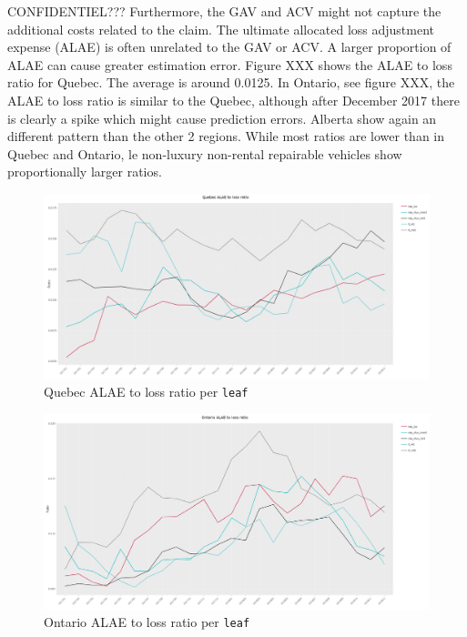 	CONFIDENTIEL???
	Furthermore, the GAV and ACV might not capture the additional costs related to the claim. The ultimate allocated loss adjustment expense (ALAE) is often unrelated to the GAV or ACV. A larger proportion of ALAE can cause greater estimation error. Figure XXX shows the ALAE to loss ratio for Quebec. The average is around 0.0125. In Ontario, see figure XXX, the ALAE to loss ratio is similar to the Quebec, although after December 2017 there is clearly a spike which might cause prediction errors. Alberta show again an different pattern than the other 2 regions. While most ratios are lower than in Quebec and Ontario, le non-luxury  non-rental repairable vehicles show proportionally larger ratios. 
	
	\begin{figure}[H]
		\begin{center}
			\includegraphics[scale=0.2]{Graphiques/QC_ALAE_loss} 
			\renewcommand{\figurename}{Figure}
			\caption{Quebec ALAE to loss ratio per \texttt{leaf}}\label{Fig_QC_ALAE_loss}
		\end{center}
	\end{figure}

	\begin{figure}[H]
		\begin{center}
				\includegraphics[scale=0.2]{Graphiques/ON_ALAE_loss} 
			\renewcommand{\figurename}{Figure}
			\caption{Ontario ALAE to loss ratio per \texttt{leaf}}\label{Fig_ON_ALAE_loss}
		\end{center}
	\end{figure}
	
